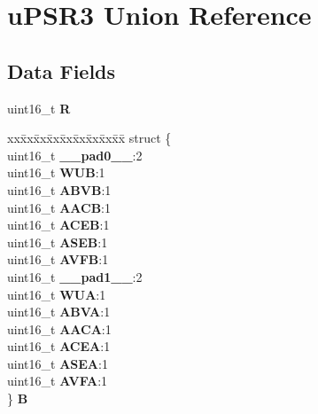 \hypertarget{unionuPSR3}{}\section{u\+P\+S\+R3 Union Reference}
\label{unionuPSR3}
\subsection*{Data Fields}
\begin{DoxyCompactItemize}
\item 
\mbox{\label{unionuPSR3_abd41368f05898cd970bfa36ff9c11a1b}} 
uint16\+\_\+t {\bfseries R}
\item 
\mbox{\label{unionuPSR3_a703e54377731350fc6c73a0579fd45aa}} 
\begin{tabbing}
xx\=xx\=xx\=xx\=xx\=xx\=xx\=xx\=xx\=\kill
struct \{\\
\>uint16\_t {\bfseries \_\_pad0\_\_}:2\\
\>uint16\_t {\bfseries WUB}:1\\
\>uint16\_t {\bfseries ABVB}:1\\
\>uint16\_t {\bfseries AACB}:1\\
\>uint16\_t {\bfseries ACEB}:1\\
\>uint16\_t {\bfseries ASEB}:1\\
\>uint16\_t {\bfseries AVFB}:1\\
\>uint16\_t {\bfseries \_\_pad1\_\_}:2\\
\>uint16\_t {\bfseries WUA}:1\\
\>uint16\_t {\bfseries ABVA}:1\\
\>uint16\_t {\bfseries AACA}:1\\
\>uint16\_t {\bfseries ACEA}:1\\
\>uint16\_t {\bfseries ASEA}:1\\
\>uint16\_t {\bfseries AVFA}:1\\
\} {\bfseries B}\\


\end{tabbing}
\end{DoxyCompactItemize}
